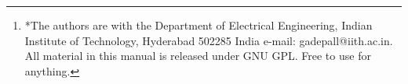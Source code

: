\documentclass[journal,12pt,twocolumn]{IEEEtran}
\begin{document}
\author{N Chakradhar$^{*}$, P.~N.~V.~S.~S.~K.~ HAVISH$^{*}$, S.~.S.~Ashish$^{*}$ and G V V Sharma$^{*}$ %
\thanks{*The authors are with the Department
of Electrical Engineering, Indian Institute of Technology, Hyderabad
502285 India e-mail:  gadepall@iith.ac.in.  All material in this manual is released under GNU GPL. Free to use for anything.}%
}
% 
%



% 




\end{document}
